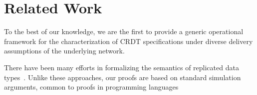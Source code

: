 
\section{Related Work}
\label{sec:related-work}

To the best of our knowledge, we are the first to provide a generic
operational framework for the characterization of CRDT specifications
under diverse delivery assumptions of the underlying network.
%

There have been many efforts in formalizing the semantics of
replicated data types~\cite{Burckhardt:2014,Burckhardt14b,ZellerBP14}.
%
Unlike these approaches, our proofs are based on standard simulation
arguments, common to proofs in programming languages



